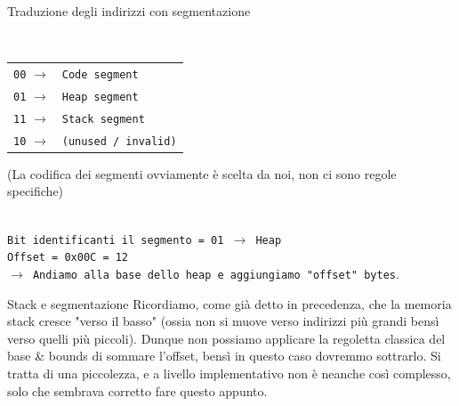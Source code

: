 \documentclass[12pt]{report}
\begin{document}
	\begin{esempio}{Traduzione degli indirizzi con segmentazione}{}
		
		\vspace{1em}
		
		\\
		\begin{tabular}{@{\hspace{1.5em}}l@{\hspace{0.5em}}l}
			\texttt{00} $\rightarrow$ & \texttt{Code segment} \\
			\texttt{01} $\rightarrow$ & \texttt{Heap segment} \\
			\texttt{11} $\rightarrow$ & \texttt{Stack segment} \\
			\texttt{10} $\rightarrow$ & \texttt{(unused / invalid)}
		\end{tabular}
		\newline
		(La codifica dei segmenti ovviamente è scelta da noi, non ci sono regole specifiche)
		
		\vspace{1em}
		
		\\
		\hspace*{1.5em}\texttt{Bit identificanti il segmento = 01 $\rightarrow$ Heap}\\
		\hspace*{1.5em}\texttt{Offset = 0x00C = 12}\\
		\hspace*{1.5em}\texttt{$\rightarrow$ Andiamo alla base dello heap e aggiungiamo "offset" bytes}.
	\end{esempio}
	
	\begin{osservazione}{Stack e segmentazione}{}
		Ricordiamo, come già detto in precedenza, che la memoria stack cresce "verso il basso" (ossia non si muove verso indirizzi più grandi bensì verso quelli più piccoli). Dunque non possiamo applicare la regoletta classica del base \& bounds di sommare l'offset, bensì in questo caso dovremmo sottrarlo. Si tratta di una piccolezza, e a livello implementativo non è neanche così complesso, solo che sembrava corretto fare questo appunto.
	\end{osservazione}
	
\end{document}
